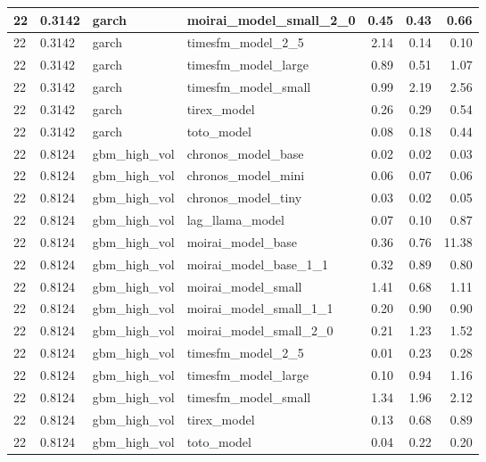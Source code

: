 {\begin{tabular}{llllrrr}
\midrule
22 & 0.3142 & garch & moirai\_model\_small\_2\_0 & 0.45 & 0.43 & 0.66 \\
\midrule
22 & 0.3142 & garch & timesfm\_model\_2\_5 & 2.14 & 0.14 & 0.10 \\
\midrule
22 & 0.3142 & garch & timesfm\_model\_large & 0.89 & 0.51 & 1.07 \\
\midrule
22 & 0.3142 & garch & timesfm\_model\_small & 0.99 & 2.19 & 2.56 \\
\midrule
22 & 0.3142 & garch & tirex\_model & 0.26 & 0.29 & 0.54 \\
\midrule
22 & 0.3142 & garch & toto\_model & 0.08 & 0.18 & 0.44 \\
\midrule
22 & 0.8124 & gbm\_high\_vol & chronos\_model\_base & 0.02 & 0.02 & 0.03 \\
\midrule
22 & 0.8124 & gbm\_high\_vol & chronos\_model\_mini & 0.06 & 0.07 & 0.06 \\
\midrule
22 & 0.8124 & gbm\_high\_vol & chronos\_model\_tiny & 0.03 & 0.02 & 0.05 \\
\midrule
22 & 0.8124 & gbm\_high\_vol & lag\_llama\_model & 0.07 & 0.10 & 0.87 \\
\midrule
22 & 0.8124 & gbm\_high\_vol & moirai\_model\_base & 0.36 & 0.76 & 11.38 \\
\midrule
22 & 0.8124 & gbm\_high\_vol & moirai\_model\_base\_1\_1 & 0.32 & 0.89 & 0.80 \\
\midrule
22 & 0.8124 & gbm\_high\_vol & moirai\_model\_small & 1.41 & 0.68 & 1.11 \\
\midrule
22 & 0.8124 & gbm\_high\_vol & moirai\_model\_small\_1\_1 & 0.20 & 0.90 & 0.90 \\
\midrule
22 & 0.8124 & gbm\_high\_vol & moirai\_model\_small\_2\_0 & 0.21 & 1.23 & 1.52 \\
\midrule
22 & 0.8124 & gbm\_high\_vol & timesfm\_model\_2\_5 & 0.01 & 0.23 & 0.28 \\
\midrule
22 & 0.8124 & gbm\_high\_vol & timesfm\_model\_large & 0.10 & 0.94 & 1.16 \\
\midrule
22 & 0.8124 & gbm\_high\_vol & timesfm\_model\_small & 1.34 & 1.96 & 2.12 \\
\midrule
22 & 0.8124 & gbm\_high\_vol & tirex\_model & 0.13 & 0.68 & 0.89 \\
\midrule
22 & 0.8124 & gbm\_high\_vol & toto\_model & 0.04 & 0.22 & 0.20 \\
\bottomrule
\end{tabular}
}